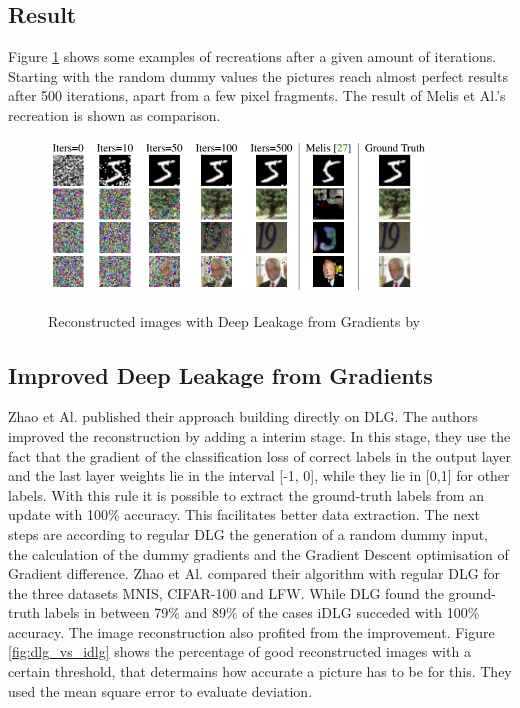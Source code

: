 \documentclass[
	ngerman,
	ruledheaders=section,%
	class=report,%
	thesis={type=bachelor},%
	accentcolor=1b,%
	custommargins=true,%
	marginpar=false,%
	parskip=half-,%
	fontsize=11pt,%
]{tudapub}
\begin{document}
\subsection{Result}
Figure \ref{fig:dlg_result} shows some examples of recreations after a given amount of iterations. Starting with the random dummy values the pictures reach almost perfect results after 500 iterations, apart from a few pixel fragments. The result of Melis et Al.'s \cite{melis2019exploiting} recreation is shown as comparison.

\begin{figure}[H] 
  \centering
    \includegraphics[width=0.9\textwidth]{Figures/DLG_result.PNG}\\
  \caption{Reconstructed images with Deep Leakage from Gradients by \cite{zhu2019deep}}
  \label{fig:dlg_result}
\end{figure}

\subsection{Improved Deep Leakage from Gradients}
Zhao et Al. \cite{zhao2020idlg} published their approach building directly on DLG. The authors improved the reconstruction by adding a interim stage. In this stage, they use the fact that the gradient of the classification loss of correct labels in the output layer and the last layer weights lie in the interval [-1, 0], while they lie in [0,1] for other labels. With this rule it is possible to extract the ground-truth labels from an update with 100\% accuracy. This facilitates better data extraction. The next steps are according to regular DLG the generation of a random dummy input, the calculation of the dummy gradients and the Gradient Descent optimisation of Gradient difference. Zhao et Al. compared their algorithm with regular DLG for the three datasets MNIS, CIFAR-100 and LFW. While DLG found the ground-truth labels in between 79\% and 89\% of the cases iDLG succeded with 100\% accuracy. The image reconstruction also profited from the improvement. Figure \ref{fig:dlg_vs_idlg} shows the percentage of good reconstructed images with a certain threshold, that determains how accurate a picture has to be for this. They used the mean square error to evaluate deviation.
\end{document}
